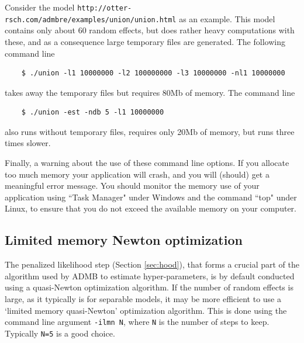 \documentclass[12pt,letter,reqno]{book}
\begin{document}
Consider the model \texttt{http://otter-rsch.com/admbre/examples/union/union.html} as an example. This model contains only about 60 random effects,
but does rather heavy computations with these, and as a consequence large temporary files are generated.
The following command line
\begin{lstlisting}
    $ ./union -l1 10000000 -l2 100000000 -l3 10000000 -nl1 10000000
\end{lstlisting}
takes away the temporary files but requires 80Mb of memory. The command line
\begin{lstlisting}
    $ ./union -est -ndb 5 -l1 10000000
\end{lstlisting}
also runs without temporary files, requires only 20Mb of memory, but runs three times slower.

Finally, a warning about the use of these command line options. If you allocate too much memory your application will crash,
and you will (should) get a meaningful error message. You should monitor the memory use of your application using ``Task
Manager" under Windows and the command ``top" under Linux, to ensure that you do not exceed the available memory
on your computer.

\subsection{Limited memory Newton optimization}
The penalized likelihood step (Section \ref{sec:hood}), that forms a crucial
part of the algorithm used by ADMB to estimate hyper-parameters, is by default conducted using a quasi-Newton
optimization algorithm. If the number of random effects is large, as it typically is for separable models, it
may be more efficient to use a `limited memory quasi-Newton' optimization algorithm. This is done using the
command line argument \texttt{-ilmn N}, where \texttt{N} is the number of steps to keep. Typically \texttt{N=5}
is a good choice. 
\end{document}
